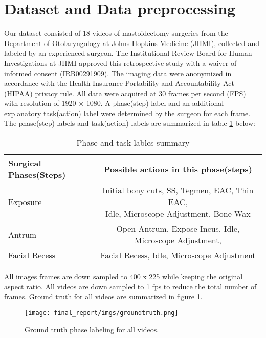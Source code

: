\documentclass[11pt]{article} \usepackage[top=1in, bottom=1in, left=1in, right=1in]{geometry}
\begin{document}
\section{Dataset and Data preprocessing}
Our dataset consisted of 18 videos of mastoidectomy surgeries from the Department of Otolaryngology at Johns Hopkins Medicine (JHMI), collected and labeled by an experienced surgeon. The Institutional Review Board for Human Investigations at JHMI approved this retrospective study with a waiver of informed consent (IRB00291909). The imaging data were anonymized in accordance with the Health Insurance Portability and Accountability Act (HIPAA) privacy rule. All data were acquired at 30 frames per second (FPS) with resolution of 1920 × 1080. A phase(step) label and an additional explanatory task(action) label were determined by the surgeon for each frame. The phase(step) labels and task(action) labels are summarized in table \ref{tab:labels_summary} below:
\begin{table}[ht!] 
    \centering
    \begin{tabular}{l c}
    \toprule %
    \textbf{Surgical Phases(Steps)} & \textbf{Possible actions in this phase(steps)}\\ 
    \midrule %
        Exposure  &\makecell{Initial bony cuts, SS, Tegmen, EAC, Thin EAC,\\ Idle, Microscope Adjustment, Bone Wax}\\
        Antrum    & Open Antrum, Expose Incus, Idle, Microscope Adjustment,  \\
        Facial Recess & Facial Recess, Idle, Microscope Adjustment\\
    \bottomrule %
    \end{tabular}
    \caption{Phase and task lables summary}
    \label{tab:labels_summary} 
\end{table}

\vspace{0.25cm}
\noindent
All images frames are down sampled to 400 x 225 while keeping the original aspect ratio. All videos are down sampled to 1 fps to reduce the total number of frames. Ground truth for all videos are summarized in figure \ref{fig:gt}.
\begin{figure}[H]
  \texttt{[image: final\_report/imgs/groundtruth.png]}
  \centering
  \caption{Ground truth phase labeling for all videos.}
  \label{fig:gt}
\end{figure}
\end{document}

